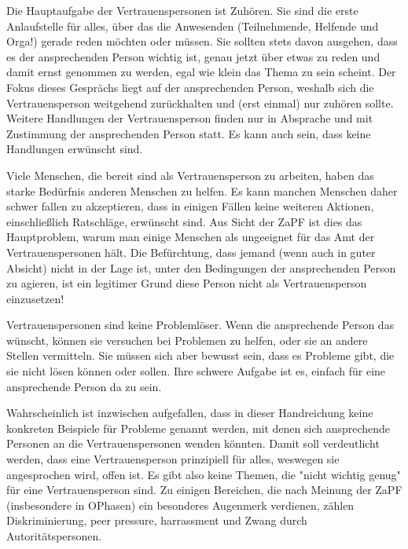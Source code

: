 \documentclass[DIV=calc]{scrartcl}
\begin{document}
Die Hauptaufgabe der Vertrauenspersonen ist Zuhören. Sie sind die erste Anlaufstelle für alles, über das die Anwesenden (Teilnehmende, Helfende und Orga!) gerade reden möchten oder müssen. Sie sollten stets davon ausgehen, dass es der ansprechenden Person wichtig ist, genau jetzt über etwas zu reden und damit ernst genommen zu werden, egal wie klein das Thema zu sein scheint. 
Der Fokus dieses Gesprächs liegt auf der ansprechenden Person, weshalb sich die Vertrauensperson weitgehend zurückhalten und (erst einmal) nur zuhören sollte.
Weitere Handlungen der Vertrauensperson finden nur in Absprache und mit Zustimmung der ansprechenden Person statt. Es kann auch sein, dass keine Handlungen erwünscht sind. 

Viele Menschen, die bereit sind als Vertrauensperson zu arbeiten, haben das starke Bedürfnis anderen Menschen zu helfen. 
Es kann manchen Menschen daher schwer fallen zu akzeptieren, dass in einigen Fällen keine weiteren Aktionen, einschließlich Ratschläge, erwünscht sind. Aus Sicht der ZaPF ist dies das Hauptproblem, warum man einige Menschen als ungeeignet für das Amt der Vertrauenspersonen hält. Die Befürchtung, dass jemand (wenn auch in guter Absicht) nicht in der Lage ist, unter den Bedingungen der ansprechenden Person zu agieren, ist ein legitimer Grund diese Person nicht als Vertrauensperson einzusetzen!

Vertrauenspersonen sind keine Problemlöser. Wenn die ansprechende Person das wün\-scht, können sie versuchen bei Problemen zu helfen, oder sie an andere Stellen vermitteln. Sie müssen sich aber bewusst sein, dass es Probleme gibt, die sie nicht lösen können oder sollen. Ihre schwere Aufgabe ist es, einfach für eine ansprechende Person da zu sein. 

Wahrscheinlich ist inzwischen aufgefallen, dass in dieser Handreichung keine konkreten Beispiele für Probleme genannt werden, mit denen sich ansprechende Personen an die Vertrauenspersonen wenden könnten. Damit soll verdeutlicht werden, dass eine Vertrauensperson prinzipiell für alles, weswegen sie angesprochen wird, offen ist. Es gibt also keine Themen, die "nicht wichtig genug" für eine Vertrauensperson sind. Zu einigen Bereichen, die nach Meinung der ZaPF (insbesondere in OPhasen) ein besonderes Augenmerk verdienen, zählen Diskriminierung, peer pressure, harrassment und Zwang durch Autoritätspersonen.
\end{document}
